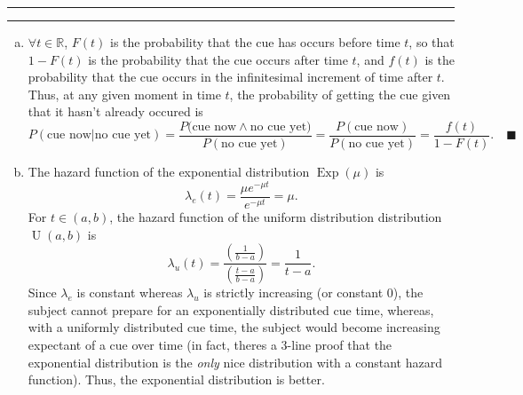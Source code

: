 \documentclass[11pt]{article}
\newcounter{questionCounter}
\newcounter{partCounter}[questionCounter]
\newenvironment{question}[2][\arabic{questionCounter}]{%
    \setcounter{partCounter}{0}%
    \vspace{.25in} \hrule \vspace{0.5em}%
        \noindent{\bf #2}%
    \vspace{0.8em} \hrule \vspace{.10in}%
    \addtocounter{questionCounter}{1}%
}{}
\newcommand{\mqed}{\quad \blacksquare}
\newcommand{\R}{\mathbb{R}} %
\newcommand{\Exp}[1]{\operatorname{Exp}\left(#1\right)} %
\newcommand{\U}[2]{\operatorname{U}\left(#1,#2\right)} %
\begin{document}
\begin{question}{Problem 5}
\begin{enumerate}[a.]
\item $\forall t \in \R$, $F(t)$ is the probability that the cue has occurs
before time $t$, so that $1 - F(t)$ is the probability that the cue occurs
after time $t$, and $f(t)$ is the probability that the cue occurs in the
infinitesimal increment of time after $t$. Thus, at any given moment in time
$t$, the probability of getting the cue given that it hasn't already occured
is
\[P(\mbox{cue now} | \mbox{no cue yet})
 = \frac{P(\mbox{cue now} \wedge \mbox{no cue yet)}}{P(\mbox{no cue yet})}
 = \frac{P(\mbox{cue now})}{P(\mbox{no cue yet})}
 = \frac{f(t)}{1 - F(t)}. \mqed
\]
\item The hazard function of the exponential distribution $\Exp{\mu}$ is
\[\lambda_e(t)
 = \frac{\mu e^{-\mu t}}{e^{-\mu t}}
 = \mu.
\]
For $t \in (a,b)$, the hazard function of the uniform distribution
distribution $\U{a}{b}$ is
\[\lambda_u(t)
 = \frac{\left( \frac{1}{b - a} \right)}{\left( \frac{t - a}{b - a} \right)}
 = \frac{1}{t - a}.
\]
Since $\lambda_{e}$ is constant whereas $\lambda_{u}$ is strictly increasing
(or constant $0$), the subject cannot prepare for an exponentially distributed
cue time, whereas, with a uniformly distributed cue time, the subject would
become increasing expectant of a cue over time (in fact, theres a $3$-line
proof that the exponential distribution is the \emph{only} nice distribution
with a constant hazard function). Thus, the exponential distribution is better.
\end{enumerate}
\end{question}
\end{document}
